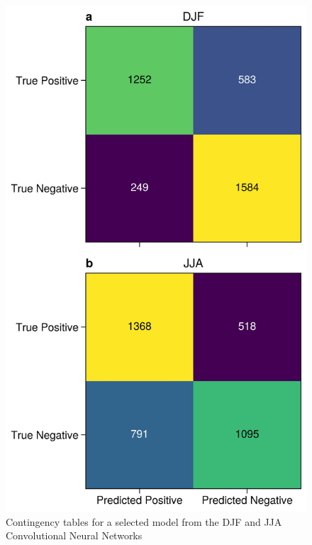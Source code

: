 \documentclass{ametsocV6.1}
\begin{document}
 \begin{figure}[t]
  \noindent\includegraphics[width=30pc,angle=0]{FigureC1.jpg}
  \caption{Contingency tables for a selected model from the DJF and JJA Convolutional Neural Networks}\label{fC1}
\end{figure}
\end{document}
